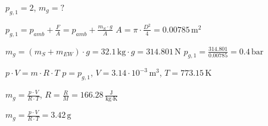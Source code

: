\( p_{g,1} = 2 \), \( m_{g} = ? \)  

\( p_{g,1} = p_{amb} + \frac{F}{A} = p_{amb} + \frac{m_{S} \cdot g}{A} \)  
\( A = \pi \cdot \frac{D^2}{4} = 0.00785 \, \text{m}^2 \)  

\( m_{g} = (m_{S} + m_{EW}) \cdot g = 32.1 \, \text{kg} \cdot g = 314.801 \, \text{N} \)  
\( p_{g,1} = \frac{314.801}{0.00785} = 0.4 \, \text{bar} \)  

\( p \cdot V = m \cdot R \cdot T \)  
\( p = p_{g,1} \), \( V = 3.14 \cdot 10^{-3} \, \text{m}^3 \), \( T = 773.15 \, \text{K} \)  

\( m_{g} = \frac{p \cdot V}{R \cdot T} \), \( R = \frac{R}{M} = 166.28 \, \frac{\text{J}}{\text{kg·K}} \)  

\( m_{g} = \frac{p \cdot V}{R \cdot T} = 3.42 \, \text{g} \)